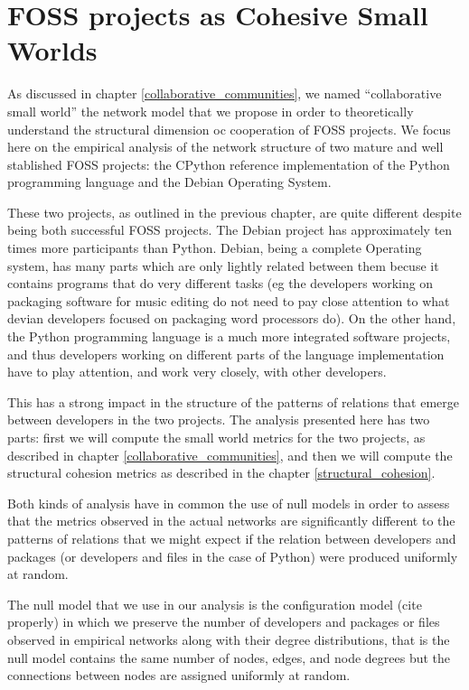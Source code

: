 \chapter{FOSS projects as Cohesive Small Worlds}

As discussed in chapter \ref{collaborative_communities}, we named ``collaborative small world'' the network model that we propose in order to theoretically understand the structural dimension oc cooperation of FOSS projects. We focus here on the empirical analysis of the network structure of two mature and well stablished FOSS projects: the CPython reference implementation of the Python programming language and the Debian Operating System.

These two projects, as outlined in the previous chapter, are quite different despite being both successful FOSS projects. The Debian project has approximately ten times more participants than Python. Debian, being a complete Operating system, has many parts which are only lightly related between them becuse it contains programs that do very different tasks (eg the developers working on packaging software for music editing do not need to pay close attention to what devian developers focused on packaging word processors do). On the other hand, the Python programming language is a much more integrated software projects, and thus developers working on different parts of the language implementation have to play attention, and work very closely, with other developers.

This has a strong impact in the structure of the patterns of relations that emerge between developers in the two projects. The analysis presented here has two parts: first we will compute the small world metrics for the two projects, as described in chapter \ref{collaborative_communities}, and then we will compute the structural cohesion metrics as described in the chapter \ref{structural_cohesion}.

Both kinds of analysis have in common the use of null models in order to assess that the metrics observed in the actual networks are significantly different to the patterns of relations that we might expect if the relation between developers and packages (or developers and files in the case of Python) were produced uniformly at random.

The null model that we use in our analysis is the configuration model (cite properly) in which we preserve the number of developers and packages or files observed in empirical networks along with their degree distributions, that is the null model contains the same number of nodes, edges, and node degrees but the connections between nodes are assigned uniformly at random.

